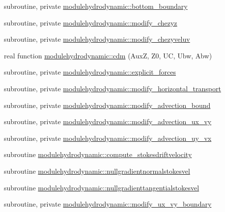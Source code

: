 \begin{DoxyCompactItemize}
\item 
subroutine, private \mbox{\hyperlink{namespacemodulehydrodynamic_a560d4076559adb32fe2884f63e0b13da}{modulehydrodynamic\+::bottom\+\_\+boundary}}
\item 
subroutine, private \mbox{\hyperlink{namespacemodulehydrodynamic_a4b8bde093197fe02063699036c456839}{modulehydrodynamic\+::modify\+\_\+chezyz}}
\item 
subroutine, private \mbox{\hyperlink{namespacemodulehydrodynamic_a8e14732a1f66519f456c093908a3ee4b}{modulehydrodynamic\+::modify\+\_\+chezyveluv}}
\item 
real function \mbox{\hyperlink{namespacemodulehydrodynamic_a5465756a3c0bc0b2789b8cbffd16ec64}{modulehydrodynamic\+::cdm}} (AuxZ, Z0, UC, Ubw, Abw)
\item 
subroutine, private \mbox{\hyperlink{namespacemodulehydrodynamic_a789f1e7896025efc57bee4107cc31422}{modulehydrodynamic\+::explicit\+\_\+forces}}
\item 
subroutine, private \mbox{\hyperlink{namespacemodulehydrodynamic_a4bfe52cf1e114fade20b4037cfdf542a}{modulehydrodynamic\+::modify\+\_\+horizontal\+\_\+transport}}
\item 
subroutine, private \mbox{\hyperlink{namespacemodulehydrodynamic_a07085db86ddaf25769704243d0003e91}{modulehydrodynamic\+::modify\+\_\+advection\+\_\+bound}}
\item 
subroutine, private \mbox{\hyperlink{namespacemodulehydrodynamic_af43a9493ede9bd9769c3084aeeb523f8}{modulehydrodynamic\+::modify\+\_\+advection\+\_\+ux\+\_\+vy}}
\item 
subroutine, private \mbox{\hyperlink{namespacemodulehydrodynamic_ac84a050bb84449fb6c44f7788ee3ff4f}{modulehydrodynamic\+::modify\+\_\+advection\+\_\+uy\+\_\+vx}}
\item 
subroutine \mbox{\hyperlink{namespacemodulehydrodynamic_aa9d607cb819115ecbd2eaade1767926c}{modulehydrodynamic\+::compute\+\_\+stokesdriftvelocity}}
\item 
subroutine \mbox{\hyperlink{namespacemodulehydrodynamic_a4ecf50b9477e7ba12adebe7aef0435c9}{modulehydrodynamic\+::nullgradientnormalstokesvel}}
\item 
subroutine \mbox{\hyperlink{namespacemodulehydrodynamic_a0b72f75ffb8470f241904b141a68198e}{modulehydrodynamic\+::nullgradienttangentialstokesvel}}
\item 
subroutine, private \mbox{\hyperlink{namespacemodulehydrodynamic_aa6b040cc956589c18c71f8802c0239ed}{modulehydrodynamic\+::modify\+\_\+ux\+\_\+vy\+\_\+boundary}}
\item 

\end{DoxyCompactItemize}
